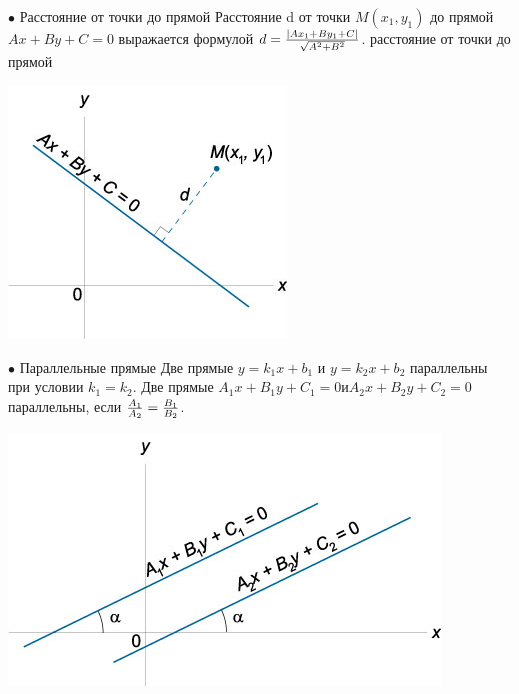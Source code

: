 \documentclass[oneside]{book}
\begin{document}
\begin{itemize}
\begin{enumerate}
$\bullet$ Расстояние от точки до прямой
Расстояние d от точки $M\left( {{x_1},{y_1}} \right)$ до прямой $Ax + By + C = 0$ выражается формулой
$d = \large\frac{{\left| {A{x_1} + B{y_1} + C} \right|}}{{\sqrt {{A^2} + {B^2}} }}\normalsize$.
расстояние от точки до прямой
\begin{center}
\includegraphics[scale=0.4]{./pics/14.jpg}
\end{center}

$\bullet$ Параллельные прямые
Две прямые $y = {k_1}x + {b_1} $ и $ y = {k_2}x + {b_2}$ параллельны при условии
${k_1} = {k_2}$.
Две прямые ${A_1}x + {B_1}y + {C_1} = 0 и {A_2}x + {B_2}y + {C_2} = 0$ параллельны, если
$\large\frac{{{A_1}}}{{{A_2}}}\normalsize = \large\frac{{{B_1}}}{{{B_2}}}\normalsize$.
\begin{center}
\includegraphics[scale=0.4]{./pics/15.jpg}
\end{center}


\end{enumerate}
\end{itemize}
\end{document}
